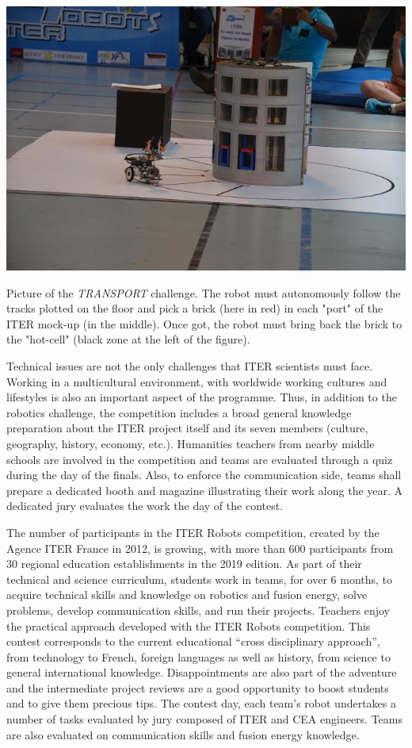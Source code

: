 \begin{marginfigure}
	\centering
	\includegraphics[width=1.0\linewidth]{figures/chap5/ITER_Robots_3}
	\caption{Picture of the \textit{TRANSPORT} challenge. The robot must autonomously follow the tracks plotted on the floor and pick a brick (here in red) in each "port" of the ITER mock-up (in the middle). Once got, the robot must bring back the brick to the "hot-cell" (black zone at the left of the figure).}
	\label{fig:iterrobots3}
\end{marginfigure}

Technical issues are not the only challenges that ITER scientists must face. Working in a multicultural environment, with worldwide working cultures and lifestyles is also an important aspect of the programme. Thus, in addition to the robotics challenge, the competition includes a broad general knowledge preparation about the ITER project itself and its seven members (culture, geography, history, economy, etc.). Humanities teachers from nearby middle schools are involved in the competition and teams are evaluated through a quiz during the day of the finals. Also, to enforce the communication side, teams shall prepare a dedicated booth and magazine illustrating their work along the year. A dedicated jury evaluates the work the day of the contest.


The number of participants in the ITER Robots competition, created by the Agence ITER France in 2012, is growing, with more than 600 participants from 30 regional education establishments in the 2019 edition. As part of their technical and science curriculum, students work in teams, for over 6 months, to acquire technical skills and knowledge on robotics and fusion energy, solve problems, develop communication skills, and run their projects. Teachers enjoy the practical approach developed with the ITER Robots competition. This contest corresponds to the current educational “cross disciplinary approach”, from technology to French, foreign languages as well as history, from science to general international knowledge. Disappointments are also part of the adventure and the intermediate project reviews are a good opportunity to boost students and to give them precious tips. The contest day, each team's robot undertakes a number of tasks evaluated by jury composed of ITER and CEA engineers. Teams are also evaluated on communication skills and fusion energy knowledge. 


